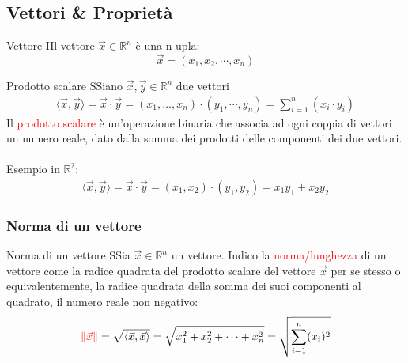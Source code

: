 \documentclass{article}  %
\begin{document}
\subsection{Vettori \& Proprietà}
\begin{definition}{Vettore}
	IIl vettore $\vec{x} \in \mathbb{R}^n$ è una n-upla:
	\[
		\vec{x}=\left(x_1,x_2,\cdots,x_n\right)
	\]
\end{definition}
\begin{definition}{Prodotto scalare}
	SSiano $\vec{x},\vec{y} \in \mathbb{R}^n$ due vettori
	\begin{align*}
		\langle \vec{x},\vec{y} \rangle = \vec{x} \cdot \vec{y} = (x_1, \dots, x_n) \cdot (y_1, \cdots, y_n) = \sum_{i=1}^{n} \left(x_i \cdot y_i \right)
	\end{align*}
	Il \textcolor{red}{prodotto scalare} è un'operazione binaria che associa ad ogni coppia di vettori un numero reale, dato dalla somma dei prodotti delle componenti dei due vettori. \\ \\
	Esempio in $\mathbb{R}^2$:
	\begin{align*}
		\langle \vec{x},\vec{y} \rangle = \vec{x} \cdot \vec{y} = (x_1, x_2) \cdot (y_1, y_2) = x_1 y_1 + x_2 y_2
	\end{align*}
\end{definition}
\subsubsection{Norma di un vettore}
\begin{definition}{Norma di un vettore}
	SSia $\vec{x} \in \mathbb{R}^n$ un vettore. Indico la \textcolor{red}{norma/lunghezza} di un vettore come la radice quadrata del prodotto scalare del vettore $\vec{x}$ per se stesso
	o equivalentemente, la radice quadrata della somma dei suoi componenti al quadrato, il numero reale non negativo:
	\[
		\textcolor{red}{\|\vec{x}\|}=\sqrt{\langle \vec{x}, \vec{x} \rangle}=\sqrt{x_1^2+x_2^2+ \cdots + x_n^2}=\sqrt{\sum_{i=1}^{n}(x_i)^2}
	\]
\end{definition}
\end{document}
